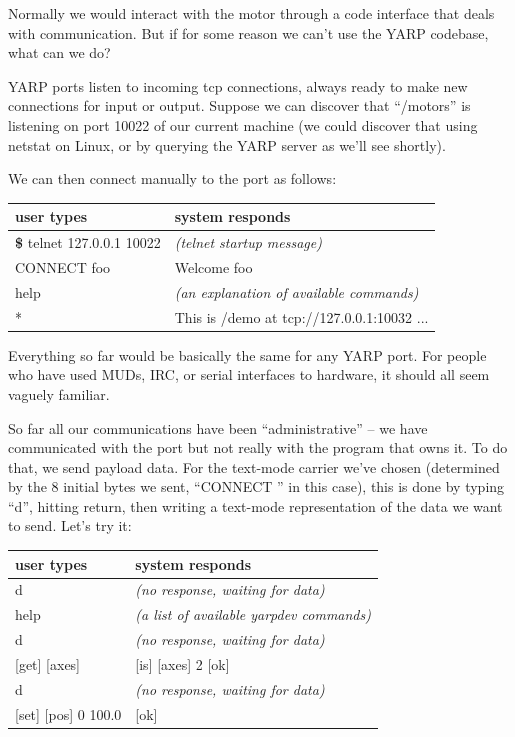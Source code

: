 Normally we would interact with the motor through a code
interface that deals with communication.  But if for 
some reason we can't use the YARP codebase, what can
we do?

YARP ports listen to incoming tcp connections, always ready to make
new connections for input or output.  Suppose we can discover that
``/motors'' is listening on port 10022 of our current machine (we could
discover that using netstat on Linux, or by querying the YARP server
as we'll see shortly).

We can then connect manually to the port as follows:

\begin{center}
\begin{tabular}{ll}
\hline\hline
{\bf user types} & {\bf system responds} \\
\hline
{\bf \$} telnet 127.0.0.1 10022 & {\it (telnet startup message)} \\
CONNECT foo & Welcome foo \\
help & {\it (an explanation of available commands)} \\
* & This is /demo at tcp://127.0.0.1:10032 ... \\
\hline\hline
\end{tabular}
\end{center}

Everything so far would be basically the same for any YARP port.
For people who have used MUDs, IRC, or serial interfaces to hardware,
it should all seem vaguely familiar.

So far all our communications have been ``administrative'' --
we have communicated with the port but not really with the 
program that owns it.  To do that, we send payload data.  For the
text-mode carrier we've chosen (determined by the 8 initial
bytes we sent, ``CONNECT '' in this case), this is done by typing
``d'', hitting return, then writing a text-mode representation of
the data we want to send.  Let's try it:

\begin{center}
\begin{tabular}{ll}
\hline\hline
{\bf user types} & {\bf system responds} \\
\hline
 d & {\it (no response, waiting for data)} \\
 help & {\it (a list of available yarpdev commands)} \\
 d & {\it (no response, waiting for data)} \\
 {[get] [axes]} &  {[is] [axes] 2 [ok]} \\
 d & {\it (no response, waiting for data)} \\
 {[set] [pos] 0 100.0} & {[ok]} \\
\hline\hline
\end{tabular}
\end{center}

